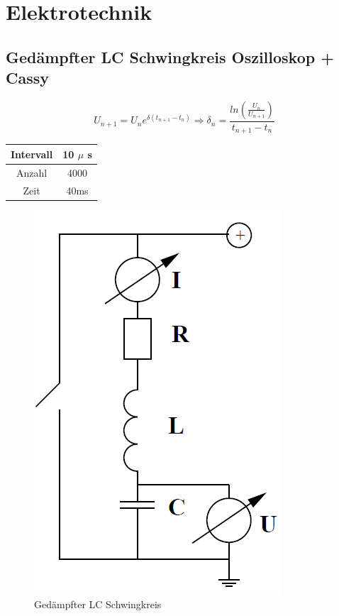 \documentclass[12pt,a4paper]{article}
\begin{document}
\section{Elektrotechnik}
\subsection{Gedämpfter LC Schwingkreis Oszilloskop + Cassy}
\begin{equation}
U_{n+1}=U_n e^{\delta(t_{n+1}-t_n)} \Rightarrow \delta_n=\frac{ln(\frac{U_n}{U_{n+1}})}{t_{n+1}-t_n}
\end{equation}
\begin{table}[H]\centering
\begin{tabular}{|c|c|}
\hline 
Intervall & 10 $\mu$ s \\ 
\hline 
Anzahl & 4000 \\ 
\hline 
Zeit & 40ms \\ 
\hline 
\end{tabular} 
\end{table}

\begin{figure}[H]
\centering
\includegraphics[scale=0.5]{GedLCSchwingkreis.PNG}
\caption{Gedämpfter LC Schwingkreis}
\end{figure}
\end{document}
